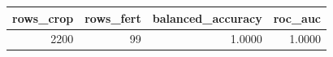 \begin{tabular}{rrrr}
\toprule
rows_crop & rows_fert & balanced_accuracy & roc_auc \\
\midrule
2200 & 99 & 1.0000 & 1.0000 \\
\bottomrule
\end{tabular}

